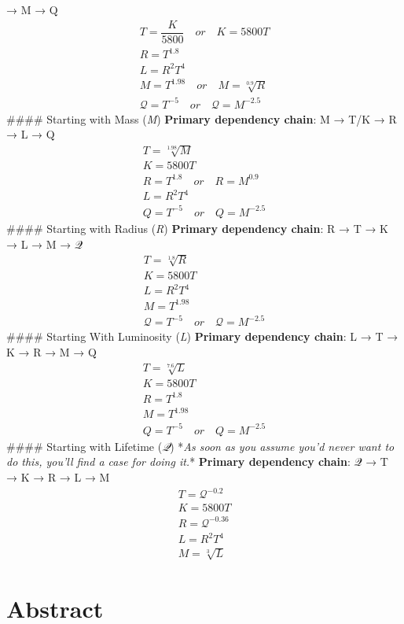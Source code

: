 \documentclass[
  letterpaper,
]{book}
\begin{document}
→ M → Q \[
\begin{gather}
T = \dfrac{K}{5800} \quad or \quad K = 5800T \\
R = T^{1.8} \\
L = R^2T^4 \\
M = T^{1.98} \quad or \quad M = \sqrt[0.9]{R} \\
\mathcal{Q} = T^{-5} \quad or \quad \mathcal{Q} = M^{-2.5}
\end{gather}
\] \#\#\#\# Starting with Mass (\emph{M}) \textbf{Primary dependency
chain}: M → T/K → R → L → Q \[
\begin{gather}
T = \sqrt[1.98]{M} \\
K = 5800T \\
R = T^{1.8} \quad or \quad R = M^{0.9} \\
L = R^2T^4 \\
Q = T^{-5} \quad or \quad Q = M^{-2.5}
\end{gather}
\] \#\#\#\# Starting with Radius (\emph{R}) \textbf{Primary dependency
chain}: R → T → K → L → M → 𝒬 \[
\begin{gather}
T = \sqrt[1.8]{R} \\
K = 5800T \\
L = R^2T^4 \\
M = T^{1.98} \\
\mathcal{Q} = T^{-5} \quad or \quad \mathcal{Q} = M^{-2.5}
\end{gather}
\] \#\#\#\# Starting With Luminosity (\emph{L}) \textbf{Primary
dependency chain}: L → T → K → R → M → Q \[
\begin{gather}
T = \sqrt[7.6]{L} \\
K = 5800T \\
R = T^{1.8} \\
M = T^{1.98} \\
Q = T^{-5} \quad or \quad Q = M^{-2.5}
\end{gather}
\] \#\#\#\# Starting with Lifetime (\emph{𝒬}) *\emph{As soon as you
assume you'd never want to do this, you'll find a case for doing it.}*
\textbf{Primary dependency chain}: 𝒬 → T → K → R → L → M \[
\begin{gather}
T=\mathcal{Q}^{-0.2} \\
K = 5800T \\
R=\mathcal{Q}^{-0.36} \\
L = R^2T^4 \\
M = \sqrt[3]{L}
\end{gather}
\]

\section{Abstract}\label{abstract-8}
\end{document}
